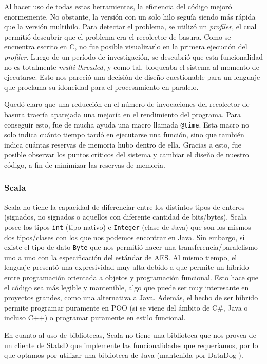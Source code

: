 \documentclass[11pt]{article}
\let\Oldsubsubsection\subsubsection
\renewcommand{\subsubsection}{\FloatBarrier\Oldsubsubsection}
\newcommand{\english}[1]{\textit{#1}}
\begin{document}
Al hacer uso de todas estas herramientas, la eficiencia del código mejoró enormemente. No obstante, la versión con un solo hilo seguía siendo más rápida que la versión multihilo. Para detectar el problema, se utilizó un \english{profiler}, el cual permitió descubrir que el problema era el recolector de basura. Como se encuentra escrito en C, no fue posible visualizarlo en la primera ejecución del \english{profiler}. Luego de un período de investigación, se descubrió que esta funcionalidad no es totalmente \english{multi-threaded}, y como tal, bloqueaba el sistema al momento de ejecutarse. Esto nos pareció una decisión de diseño cuestionable para un lenguaje que proclama su idoneidad para el procesamiento en paralelo.

Quedó claro que una reducción en el número de invocaciones del recolector de basura traería aparejada una mejoría en el rendimiento del programa. Para conseguir esto, fue de mucha ayuda una macro llamada \lstinline{@time}. Esta macro no solo indica cuánto tiempo tardó en ejecutarse una función, sino que también indica cuántas reservas de memoria hubo dentro de ella. Gracias a esto, fue posible observar los puntos críticos del sistema y cambiar el diseño de nuestro código, a fin de minimizar las reservas de memoria.

\subsubsection{Scala}

Scala no tiene la capacidad de diferenciar entre los distintos tipos de enteros (signados, no signados o aquellos con diferente cantidad de bits/bytes). Scala posee los tipos \lstinline{int} (tipo nativo) e \lstinline{Integer} (clase de Java) que son los mismos dos tipos/clases con los que nos podemos encontrar en Java. Sin embargo, sí existe el tipo de dato \lstinline{Byte} que nos permitió hacer una transferencia/paralelismo uno a uno con la especificación del estándar de AES. Al mismo tiempo, el lenguaje presentó una expresividad muy alta debido a que permite un híbrido entre programación orientada a objetos y programación funcional. Esto hace que el código sea más legible y mantenible, algo que puede ser muy interesante en proyectos grandes, como una alternativa a Java. Además, el hecho de ser híbrido permite programar puramente en POO (si se viene del ámbito de C\#, Java o incluso C++) o programar puramente en estilo funcional.

En cuanto al uso de bibliotecas, Scala no tiene una biblioteca que nos provea de un cliente de StatsD que implemente las funcionalidades que requeríamos, por lo que optamos por utilizar una biblioteca de Java \cite{scala:lib:java-dogstatsd-client} (mantenida por DataDog \cite{com:datadog}).
\end{document}
